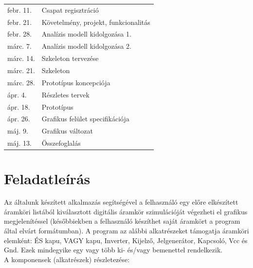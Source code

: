 \begin{tabular}{l | l}
febr. 11. & Csapat regisztráció \\
febr. 21. & Követelmény, projekt, funkcionalitás \\
febr. 28. & Analízis modell kidolgozása 1. \\
márc. 7. & Analízis modell kidolgozása 2. \\
márc. 14. & Szkeleton tervezése \\
márc. 21. & Szkeleton \\
márc. 28. & Prototípus koncepciója \\
ápr.  4. & Részletes tervek \\
ápr. 18. & Prototípus \\
ápr. 26. & Grafikus felület specifikációja \\
máj. 9. & Grafikus változat \\
máj. 13. & Összefoglalás
\end{tabular}

\section{Feladatleírás}
\label{sec:taskdesc}

Az általunk készített alkalmazás segítségével a felhasználó egy előre elkészített áramköri listából kiválasztott digitális áramkör szimulációját végezheti el grafikus megjelenítéssel (későbbiekben a felhasználó készíthet saját áramkört a program által elvárt formátumban). A program az alábbi alkatrészeket támogatja áramköri elemként: ÉS kapu, VAGY kapu, Inverter, Kijelző, Jelgenerátor, Kapcsoló, Vcc és Gnd. Ezek mindegyike egy vagy több ki- és/vagy bemenettel rendelkezik.\\

\noindent A komponensek (alkatrészek) részletezése:

